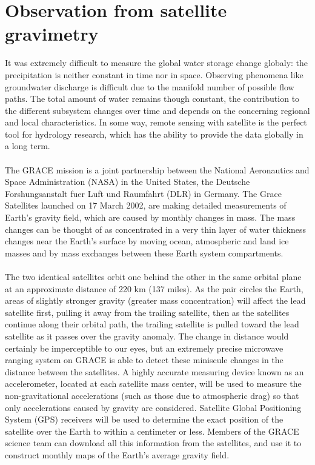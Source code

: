 \section{Observation from satellite gravimetry}
It was extremely difficult to measure the global water storage change globaly: the precipitation is neither constant in time nor in space. Observing phenomena like groundwater discharge is difficult due to the manifold number of possible flow paths. The total amount of water remains though constant, the contribution to the different subsystem changes over time and depends on the concerning regional and local characteristics. In some way, remote sensing with satellite is the perfect tool for hydrology research, which has the ability to provide the data globally in a long term.\\\\
The GRACE mission is a joint partnership between the National Aeronautics and Space Administration (NASA) in the United States, the Deutsche Forshungsanstalt fuer Luft und Raumfahrt (DLR) in Germany. The Grace Satellites launched on 17 March 2002, are making detailed measurements of Earth's gravity field, which are caused by monthly changes in mass. The mass changes can be thought of as concentrated in a very thin layer of water thickness changes near the Earth's surface by moving ocean, atmospheric and land ice masses and by mass exchanges between these Earth system compartments. \\\\
The two identical satellites orbit one behind the other in the same orbital plane at an approximate distance of 220 km (137 miles). As the pair circles the Earth, areas of slightly stronger gravity (greater mass concentration) will affect the lead satellite first, pulling it away from the trailing satellite, then as the satellites continue along their orbital path, the trailing satellite is pulled toward the lead satellite as it passes over the gravity anomaly. The change in distance would certainly be imperceptible to our eyes, but an extremely precise microwave ranging system on GRACE is able to detect these miniscule changes in the distance between the satellites. A highly accurate measuring device known as an accelerometer, located at each satellite mass center, will be used to measure the non-gravitational accelerations (such as those due to atmospheric drag) so that only accelerations caused by gravity are considered. Satellite Global Positioning System (GPS) receivers will be used to determine the exact position of the satellite over the Earth to within a centimeter or less. Members of the GRACE science team can download all this information from the satellites, and use it to construct monthly maps of the Earth's average gravity field. \\\\
